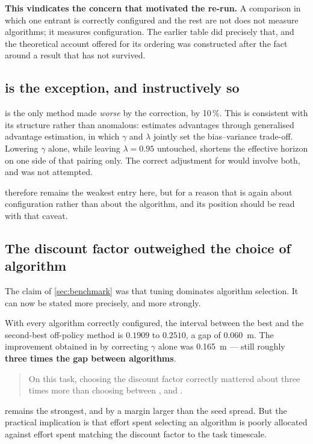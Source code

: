 \textbf{This vindicates the concern that motivated the re-run.} A comparison in
which one entrant is correctly configured and the rest are not does not measure
algorithms; it measures configuration. The earlier table did precisely that, and
the theoretical account offered for its ordering was constructed after the fact
around a result that has not survived.

\subsection{\PPO{} is the exception, and instructively so}

\PPO{} is the only method made \emph{worse} by the correction, by 10\,\%. This is
consistent with its structure rather than anomalous: \PPO{} estimates advantages
through generalised advantage estimation, in which $\gamma$ and $\lambda$ jointly
set the bias--variance trade-off. Lowering $\gamma$ alone, while leaving
$\lambda = 0.95$ untouched, shortens the effective horizon on one side of that
pairing only. The correct adjustment for \PPO{} would involve both, and was not
attempted.

\PPO{} therefore remains the weakest entry here, but for a reason that is again
about configuration rather than about the algorithm, and its position should be
read with that caveat.

\subsection{The discount factor outweighed the choice of algorithm}

The claim of \cref{sec:benchmark} was that tuning dominates algorithm selection.
It can now be stated more precisely, and more strongly.

With every algorithm correctly configured, the interval between the best and the
second-best off-policy method is $0.1909$ to $0.2510$, a gap of
\SI{0.060}{\meter}. The improvement obtained in \DDPG{} by correcting $\gamma$
alone was \SI{0.165}{\meter} --- still roughly \textbf{three times the gap
between algorithms}.

\begin{quote}
On this task, choosing the discount factor correctly mattered about three times
more than choosing between \SAC, \TDIII{} and \DDPG.
\end{quote}

\SAC{} remains the strongest, and by a margin larger than the seed spread. But
the practical implication is that effort spent selecting an algorithm is poorly
allocated against effort spent matching the discount factor to the task
timescale.

